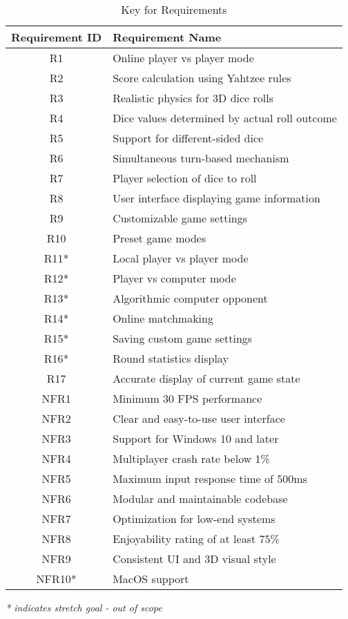 \documentclass[12pt, titlepage]{article}
\begin{document}
\begin{table}[H]
    \centering
    \caption{Key for Requirements}
    \begin{tabular}{|c|l|}
        \hline
        \textbf{Requirement ID} & \textbf{Requirement Name} \\
        \hline
R1 & Online player vs player mode \\  
R2 & Score calculation using Yahtzee rules \\  
R3 & Realistic physics for 3D dice rolls \\  
R4 & Dice values determined by actual roll outcome \\  
R5 & Support for different-sided dice \\  
R6 & Simultaneous turn-based mechanism \\  
R7 & Player selection of dice to roll \\  
R8 & User interface displaying game information \\  
R9 & Customizable game settings \\  
R10 & Preset game modes \\  
R11* & Local player vs player mode \\  
R12* & Player vs computer mode \\  
R13* & Algorithmic computer opponent \\  
R14* & Online matchmaking \\  
R15* & Saving custom game settings \\  
R16* & Round statistics display \\  
R17 & Accurate display of current game state \\  
NFR1 & Minimum 30 FPS performance \\  
NFR2 & Clear and easy-to-use user interface \\  
NFR3 & Support for Windows 10 and later \\  
NFR4 & Multiplayer crash rate below 1\% \\  
NFR5 & Maximum input response time of 500ms \\  
NFR6 & Modular and maintainable codebase \\  
NFR7 & Optimization for low-end systems \\  
NFR8 & Enjoyability rating of at least 75\% \\  
NFR9 & Consistent UI and 3D visual style \\  
NFR10* & MacOS support \\ 
        \hline
    \end{tabular}
    \label{tab:traceability_key2}
\end{table}
\textit{* indicates stretch goal - out of scope}
\end{document}

